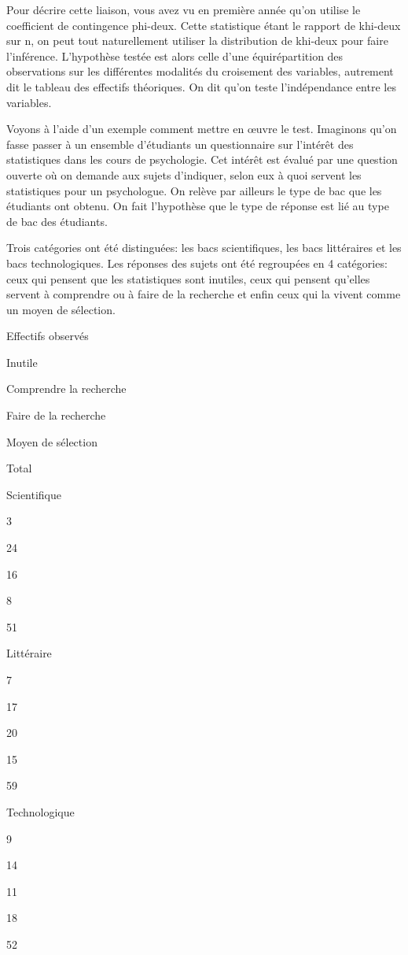 \documentclass[]{book}
\theoremstyle{definition}
\theoremstyle{definition}
\theoremstyle{definition}
\theoremstyle{remark}
\begin{document}
Pour décrire cette liaison, vous avez vu en première année qu'on utilise
le coefficient de contingence phi-deux. Cette statistique étant le
rapport de khi-deux sur n, on peut tout naturellement utiliser la
distribution de khi-deux pour faire l'inférence. L'hypothèse testée est
alors celle d'une équirépartition des observations sur les différentes
modalités du croisement des variables, autrement dit le tableau des
effectifs théoriques. On dit qu'on teste l'indépendance entre les
variables.

Voyons à l'aide d'un exemple comment mettre en œuvre le test. Imaginons
qu'on fasse passer à un ensemble d'étudiants un questionnaire sur
l'intérêt des statistiques dans les cours de psychologie. Cet intérêt
est évalué par une question ouverte où on demande aux sujets d'indiquer,
selon eux à quoi servent les statistiques pour un psychologue. On relève
par ailleurs le type de bac que les étudiants ont obtenu. On fait
l'hypothèse que le type de réponse est lié au type de bac des étudiants.

Trois catégories ont été distinguées: les bacs scientifiques, les bacs
littéraires et les bacs technologiques. Les réponses des sujets ont été
regroupées en 4 catégories: ceux qui pensent que les statistiques sont
inutiles, ceux qui pensent qu'elles servent à comprendre ou à faire de
la recherche et enfin ceux qui la vivent comme un moyen de sélection.

Effectifs observés

Inutile

Comprendre la recherche

Faire de la recherche

Moyen de sélection

Total

Scientifique

3

24

16

8

51

Littéraire

7

17

20

15

59

Technologique

9

14

11

18

52
\end{document}
